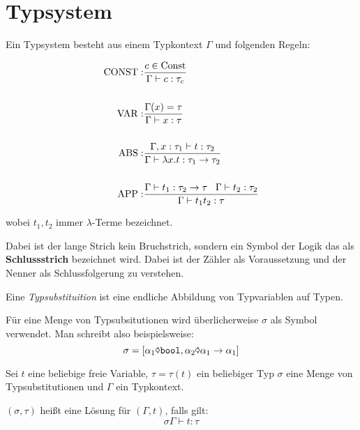 \section{Typsystem}
\begin{definition}\label{def:typsystem-t1}%
	Ein Typsystem besteht aus einem Typkontext $\Gamma$ und folgenden Regeln:

	\begin{align*}
		\operatorname{CONST}:&\frac{c \in \text{Const}}{\Gamma \vdash c: \tau_c}\\
			   &\\
		\operatorname{VAR}:  &\frac{\Gamma(x) = \tau}{\Gamma \vdash x: \tau}\\
			   &\\
		\operatorname{ABS}:  &\frac{\Gamma, x: \tau_1 \vdash t: \tau_2}{\Gamma \vdash \lambda x. t: \tau_1 \rightarrow \tau_2}\\
			   &\\
		\operatorname{APP}:  &\frac{\Gamma \vdash t_1: \tau_2 \rightarrow \tau\;\;\; \Gamma \vdash t_2: \tau_2}{\Gamma \vdash t_1 t_2: \tau} \\
	\end{align*}

    wobei $t_1, t_2$ immer $\lambda$-Terme bezeichnet.
\end{definition}


Dabei ist der lange Strich kein Bruchstrich, sondern ein Symbol der Logik das als
\textbf{Schlussstrich} bezeichnet wird. Dabei ist der
Zähler als Voraussetzung und der Nenner als Schlussfolgerung zu verstehen.

\begin{definition}[Typsubstituition]%
	Eine \textit{Typsubstituition} ist eine endliche Abbildung von Typvariablen auf
	Typen.
\end{definition}

Für eine Menge von Typsubsitutionen wird überlicherweise $\sigma$ als Symbol
verwendet. Man schreibt also beispielsweise:
\[\sigma = [\alpha_1 \text{\pointer} \text{\texttt{bool}}, \alpha_2 \text{\pointer} \alpha_1 \rightarrow \alpha_1]\]

\begin{definition}
	Sei $t$ eine beliebige freie Variable, $\tau = \tau(t)$ ein beliebiger Typ
	$\sigma$ eine Menge von Typsubstitutionen und $\Gamma$ ein Typkontext.

	$(\sigma, \tau)$ heißt eine Lösung für $(\Gamma, t)$, falls gilt:
	\[\sigma \Gamma \vdash t : \tau\]
\end{definition}

